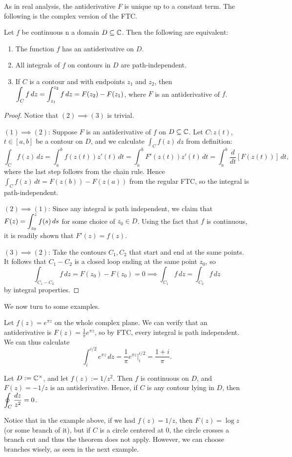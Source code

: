 \documentclass{article}
\begin{document}
As in real analysis, the antiderivative $F$ is unique up to a constant term. The following is the complex version of the FTC.
\begin{theorem}
Let $f$ be continuous n a domain $D\subseteq \mathbb C$. Then the following are equivalent:
\begin{enumerate}
    \item The function $f$ has an antiderivative on $D$.
    \item All integrals of $f$ on contours in $D$ are path-independent.
    \item If $C$ is a contour and with endpoints $z_1$ and $z_2$, then $\displaystyle\int_C f\, dz = \int_{z_1}^{z_2} f\, dz = F(z_2) - F(z_1)$, where $F$ is an antiderivative of $f$.
\end{enumerate}
\end{theorem}
\begin{proof}
Notice that $(2)\implies (3)$ is trivial.

$(1)\implies (2)$: Suppose $F$ is an antiderivative of $f$ on $D\subseteq\mathbb C$. Let $C: z(t)$, $t\in [a,b]$ be a contour on $D$, and we calculate $\int_C f(z)\, dz$ from definition:
$$\int_C f(z)\, dz = \int_a^b f(z(t))z'(t) \, dt = \int_a^b F'(z(t))z'(t)\, dt = \int_a^b \frac{d}{dt}[F(z(t))]\, dt,$$
where the last step follows from the chain rule. Hence $\int_C f(z)\, dt = F(z(b)) - F(z(a))$ from the regular FTC, so the integral is path-independent.

$(2)\implies (1)$: Since any integral is path independent, we claim that $F(z) = \displaystyle\int_{z_0}^z f(s)\, ds$ for some choice of $z_0\in D$. Using the fact that $f$ is continuous, it is readily shown that $F'(z) = f(z)$.

$(3)\implies (2)$: Take the contours $C_1, C_2$ that start and end at the same points. It follows that $C_1 - C_2$ is a closed loop ending at the same point $z_0$, so
$$\int_{C_1-C_2} f\, dz = F(z_0) - F(z_0) = 0 \implies \int_{C_1}f\, dz = \int_{C_2} f\, dz$$
by integral properties.
\end{proof} 

We now turn to some examples.
\begin{example}
Let $f(z) = e^{\pi z}$ on the whole complex plane. We can verify that an antiderivative is $F(z) = \frac 1\pi e^{\pi z}$, so by FTC, every integral is path independent. We can thus calculate
$$\int_i^{i/2}e^{\pi z}\, dz = \frac 1\pi e^{\pi z}\Big|_{i}^{i/2} = \boxed{\frac{1+i} \pi}.$$
\end{example}
\begin{example}
Let $D := \mathbb C^\times$, and let $f(z) := 1/z^2$. Then $f$ is continuous on $D$, and $F(z) = -1/z$ is an antiderivative. Hence, if $C$ is any contour lying in $D$, then $\displaystyle\oint_C \frac{dz}{z^2} = 0$.
\end{example}
Notice that in the example above, if we had $f(z) = 1/z$, then $F(z) = \log z$ (or some branch of it), but if $C$ is a circle centered at $0$, the circle crosses a branch cut and thus the theorem does not apply. However, we can choose branches wisely, as seen in the next example.
\end{document}
